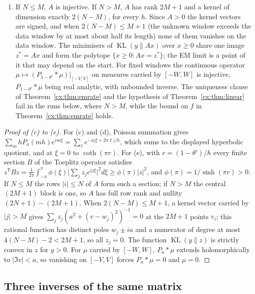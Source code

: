 \begin{enumerate}
\item[(e)] If $N\le M$, $A$ is injective. If $N>M$, $A$ has rank $2M+1$ and a kernel of dimension exactly $2(N-M)$, for every $h$. Since $A>0$ the kernel vectors are signed, and when $2(N-M)\le M+1$ (the unknown window exceeds the data window by at most about half its length) none of them vanishes on the data window. The minimisers of $\operatorname{KL}(y\|Ax)$ over $x\ge0$ share one image $z^*=Ax$ and form the polytope $\{x\ge0:Ax=z^*\}$; the EM limit is a point of it that may depend on the start. For fixed windows the continuous operator $\mu\mapsto(P_{1-\theta'}*\mu)|_{[-V,V]}$ on measures carried by $[-W,W]$ is injective, $P_{1-\theta'}*\mu$ being real analytic, with unbounded inverse. The uniqueness clause of Theorem~\ref{cx:thm:emrate} and the hypothesis of Theorem~\ref{cx:thm:linear} fail in the runs below, where $N>M$, while the bound on $f$ in Theorem~\ref{cx:thm:emrate} holds.
\end{enumerate}

\begin{proof}[Proof of (c) to (e)]
For (c) and (d), Poisson summation gives $\sum_m hP_a(mh)e^{im\xi}=\sum_\ell e^{-a|\xi+2\pi\ell|/h}$, which sums to the displayed hyperbolic quotient, and at $\xi=0$ to $\coth(\pi r)$. For (e), with $r=(1-\theta')/h$ every finite section $B$ of the Toeplitz operator satisfies $z^{\mathsf T}Bz=\frac1{2\pi}\int_{-\pi}^{\pi}\phi(\xi)\bigl|\sum_jz_je^{ij\xi}\bigr|^2d\xi\ge\phi(\pi)|z|^2$, and $\phi(\pi)=1/\sinh(\pi r)>0$. If $N\le M$ the rows $|i|\le N$ of $A$ form such a section; if $N>M$ the central $(2M+1)$ block is one, so $A$ has full row rank and nullity $(2N+1)-(2M+1)$. When $2(N-M)\le M+1$, a kernel vector carried by $|j|>M$ gives $\sum_jz_j(a^2+(v-w_j)^2)^{-1}=0$ at the $2M+1$ points $v_i$; this rational function has distinct poles $w_j\pm ia$ and a numerator of degree at most $4(N-M)-2<2M+1$, so all $z_j=0$. The function $\operatorname{KL}(y\|z)$ is strictly convex in $z$ for $y>0$. For $\mu$ carried by $[-W,W]$, $P_a*\mu$ extends holomorphically to $|\Im v|<a$, so vanishing on $[-V,V]$ forces $P_a*\mu=0$ and $\mu=0$.
\end{proof}

\subsection{Three inverses of the same matrix}

